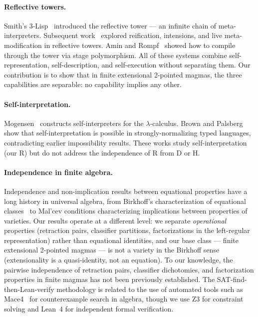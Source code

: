 \documentclass[sigconf,screen,review,anonymous]{acmart}
\theoremstyle{remark}
\begin{document}
\paragraph{Reflective towers.}
Smith's 3-Lisp~\cite{smith84} introduced the reflective tower --- an infinite chain of meta-interpreters. Subsequent work~\cite{friedman84,danvy88} explored reification, intensions, and live meta-modification in reflective towers. Amin and Rompf~\cite{amin18} showed how to compile through the tower via stage polymorphism. All of these systems combine self-representation, self-description, and self-execution without separating them. Our contribution is to show that in finite extensional 2-pointed magmas, the three capabilities are separable: no capability implies any other.

\paragraph{Self-interpretation.}
Mogensen~\cite{mogensen92} constructs self-interpreters for the $\lambda$-calculus. Brown and Palsberg~\cite{brown16} show that self-interpretation is possible in strongly-normalizing typed languages, contradicting earlier impossibility results. These works study self-interpretation (our R) but do not address the independence of R from D or H.

\paragraph{Independence in finite algebra.}
Independence and non-implication results between equational properties have a long history in universal algebra, from Birkhoff's characterization of equational classes~\cite{burris81} to Mal'cev conditions characterizing implications between properties of varieties. Our results operate at a different level: we separate \emph{operational} properties (retraction pairs, classifier partitions, factorizations in the left-regular representation) rather than equational identities, and our base class --- finite extensional 2-pointed magmas --- is not a variety in the Birkhoff sense (extensionality is a quasi-identity, not an equation). To our knowledge, the pairwise independence of retraction pairs, classifier dichotomies, and factorization properties in finite magmas has not been previously established. The SAT-find-then-Lean-verify methodology is related to the use of automated tools such as Mace4~\cite{mccune10} for counterexample search in algebra, though we use Z3 for constraint solving and Lean~4 for independent formal verification.
\end{document}
